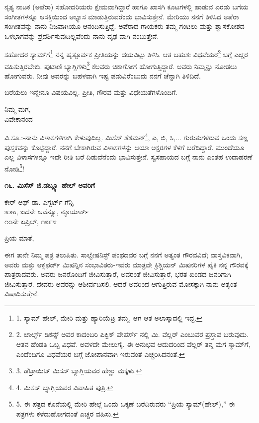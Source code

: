 ನೃತ್ಯ ನಾಟಕ (ಅಪೆರಾ) ಸಹೋದರಿಯರು ಕ್ಷೇಮವಾಗಿದ್ದಾರೆ ಹಾಗೂ ಖಾಸಗಿ ಕೂಟಗಳಲ್ಲಿ ಹಾಡುವ ಎರಡು ಬಗೆಯ ಸಂಗೀತಗಳನ್ನೂ ಆಸಕ್ತಿಯಿಂದ ಅಭ್ಯಾಸ ಮಾಡುತ್ತಿರುವರೆಂದು ಭಾವಿಸುತ್ತೇನೆ. ಮೇರಿಯು ನನಗೆ ತಿಳಿಸಿದ ಅಪೆರಾ ಸಂಗೀತವನ್ನು ನಾನು ನಿಜವಾಗಿಯೂ ಆನಂದಿಸುತ್ತಿದ್ದೆ. ಅಪೆರಾದ ಗಾಯಕರು ತಮ್ಮ ಗಂಟಲು ಮತ್ತು ಶ್ವಾಸಕೋಶದ ಒಳಭಾಗವನ್ನು ಪ್ರದರ್ಶಿಸುವುದಿಲ್ಲವೆಂದು ನಾನು ದೃಢ ವಾಗಿ ನಂಬುತ್ತೇನೆ.

ಸಹೋದರ ಸ್ಯಾಮ್​ಗೆ\footnote{1. ಸ್ಯಾಮ್​ ಹೇಲ್, ಮೇರಿ ಮತ್ತು ಹ್ಯಾರಿಯೆಟ್ರ ತಮ್ಮ, ಆಗ ಆತ ಅಲಾಸ್ಕಾದಲ್ಲಿ ಇದ್ದ.} ನನ್ನ ಹೃತ್ಪೂರ್ವಕ ಪ್ರೀತಿಯನ್ನು ದಯವಿಟ್ಟು ತಿಳಿಸಿ. ಆತ ಬಹುಶಃ ವಿಧವೆಯರ\footnote{2. ಚಾರ್ಲ್ಸ್ ಡಿಕನ್ಸ್ ಅವರ ಕಾದಂಬರಿ ಪಿಕ್ವಿಕ್ ಪೇಪರ್ಸ್ ನಲ್ಲಿ ಮಿ. ವೆಲ್ಲರ್ ಎಂಬುವರ ಪ್ರಸ್ತಾಪ ಬರುವುದು. ಆತನ ಹೆಂಡತಿ ಒಬ್ಬ ವಿಧವೆ. ಅವಳದೇ ಮೇಲುಗೈ. ಈ ಅನುಭವ ಆದುದರಿಂದ ವೆಲ್ಲರ್ ತನ್ನ ಮಗ ಸ್ಶಾಮ್​ಗೆ, ಎಂದೆಂದಿಗೂ ವಿಧವೆಯರ ಬಗ್ಗೆ ಜೋಪಾನವಾಗಿ ಇರುವಂತೆ ಎಚ್ಚರಿಸಿದನಂತೆ.} ಬಗ್ಗೆ ಎಚ್ಚರ ವಹಿಸುತ್ತಿರಬೇಕು. ಪುಟಾಣಿ ಬ್ಯಾಗ್ಲಿಗಳು\footnote{3. ಡೆಟ್ರಾಯಿಟ್ ಮಿಸಸ್ ಬ್ಯಾಗ್ಲಿಯವರ ಹೆಣ್ಣು ಮಕ್ಕಳು.} ಕೆಲವರು ಚಿಕಾಗೋಗೆ ಹೋಗುತ್ತಿದ್ದಾರೆ. ಅವರು ನಿಮ್ಮನ್ನು ನೋಡಲು ಹೋಗುವರು. ನೀವು ಅವರನ್ನು ಬಹಳವಾಗಿ ಇಷ್ಟ ಪಡುವಿರೆಂಬುದು ನನಗೆ ಚೆನ್ನಾಗಿ ತಿಳಿದಿದೆ.

ಬರೆಯಲು ಇನ್ನೇನೂ ವಿಷಯವಿಲ್ಲ. ಪ್ರೀತಿ, ಗೌರವ ಮತ್ತು ವಿಧೇಯತೆಗಳೊಂದಿಗೆ.

\begin{flushright}
ನಿಮ್ಮ ಮಗ,\\ವಿವೇಕಾನಂದ
\end{flushright}

ವಿ.ಸೂ.:-ನಾನು ವಿಳಾಸಗಳಿಗಾಗಿ ಕೇಳುವುದಿಲ್ಲ. ಮಿಸೆಸ್ ಶೆಶಮನ್\footnote{4. ಮಿಸಸ್ ಬ್ಯಾಗ್ಲಿಯವರ ವಿವಾಹಿತ ಪುತ್ರಿ.}, ಎ, ಬಿ, ಸಿ,... ಗುರುತುಗಳಿರುವ ಒಂದು ಸಣ್ಣ ಪುಸ್ತಕವನ್ನು ಕೊಟ್ಟಿದ್ದಾರೆ. ನನಗೆ ಬೇಕಾಗಿರುವ ವಿಳಾಸಗಳನ್ನು ಆಯಾ ಅಕ್ಷರಗಳ ಕೆಳಗೆ ಬರೆದಿದ್ದಾರೆ. ಮುಂದೆಯೂ ಎಲ್ಲ ವಿಳಾಸಗಳನ್ನೂ ಇದೇ ರೀತಿ ಬರೆ ದಿಡುವೆನೆಂದು ಭಾವಿಸುತ್ತೇನೆ. ಸ್ವಸಹಾಯದ ಬಗ್ಗೆ ನಾನು ಎಂತಹ ಉದಾಹರಣೆ ನೋಡಿ\footnote{5. ಈ ಪತ್ರದ ಕೊನೆಯಲ್ಲಿ ಮೇರಿ ಹೇಲ್ಗೆ ಒಂದು ಒಕ್ಕಣೆ ಬರೆದಿರುವರು “ಪ್ರಿಯ ಸ್ಯಾಮ್​ (ಹೇಲ್),” ಈ ಪತ್ರಗಳು ಕಳೆದುಹೋಗದಂತೆ ಎಚ್ಚರ ವಹಿಸು.}!

\begin{center}
\textbf{೧೬. ಮಿಸೆಸ್ ಜಿ.ಡಬ್ಲ್ಯೂ ಹೇಲ್ ಅವರಿಗೆ}
\end{center}

\begin{flushright}
ಕೇರ್ ಆಫ್ ಡಾ. ಎಗ್ಬರ್ಟ್ ಗೆನ್ಸಿ\\೫೨೮, ಐದನೇ ಅವೆನ್ಯೂ, ನ್ಯೂಯಾರ್ಕ್\\೧೦ನೇ ಏಪ್ರಿಲ್, ೧೮೯೪
\end{flushright}

ಪ್ರಿಯ ಮಾತೆ,

ಈಗ ತಾನೇ ನಿಮ್ಮ ಪತ್ರ ತಲುಪಿತು. ಸಾಲ್ವೇಷನಿಸ್ಟ್ ಪಂಥದವರ ಬಗ್ಗೆ ನನಗೆ ಅತ್ಯಂತ ಗೌರವವಿದೆ; ವಾಸ್ತವಿಕವಾಗಿ, ಅವರು ಮತ್ತು ಆಕ್ಸಫರ್ಡ್ ಮಿಷನ್ನಿನ ಸಂಭಾವಿತರು-ಇವರು ಮಾತ್ರವೇ ಕ್ರಿಶ್ಚಿಯನ್ ಮಿಷನರಿಗಳ ಪೈಕಿ ನನ್ನ ಗೌರವಕ್ಕೆ ಪಾತ್ರರಾದವರು. ಅವರು ಜನರೊಂದಿಗೆ ಜೀವಿಸುತ್ತಾರೆ, ಅವರಂತೆ ಜೀವಿಸುತ್ತಾರೆ, ಭರತ ಖಂಡದ ಜನರಿಗಾಗಿ ಜೀವಿಸುತ್ತಾರೆ. ದೇವರು ಅವರನ್ನು ಆಶೀರ್ವದಿಸಲಿ. ಆದರೆ ಅವರಿಂದ ಆಗುತ್ತಿರುವ ಮೋಸಕ್ಕಾಗಿ ನಾನು ಅತ್ಯಂತ ವಿಷಾದಿಸುತ್ತೇನೆ.

